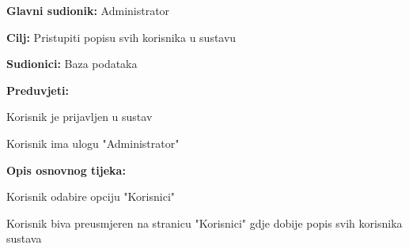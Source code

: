 					\noindent {}
					\begin{packed_item}
	
						\item \textbf{Glavni sudionik: }Administrator
						\item  \textbf{Cilj:} Pristupiti popisu svih korisnika u sustavu
						\item  \textbf{Sudionici:} Baza podataka
						\item  \textbf{Preduvjeti:}
						\item[] \begin{packed_enum}
							\item Korisnik je prijavljen u sustav
							\item Korisnik ima ulogu "Administrator"
							\end{packed_enum}
						\item  \textbf{Opis osnovnog tijeka:}
						
						\item[] \begin{packed_enum}
	
							\item Korisnik odabire opciju "Korisnici"
							\item Korisnik biva preusmjeren na stranicu "Korisnici" gdje dobije popis svih korisnika sustava
						\end{packed_enum}
					
					\end{packed_item}
					
